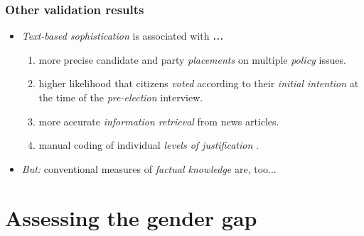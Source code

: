 \documentclass{beamer}
\begin{document}
\begin{frame} %
\frametitle{Other validation results}
\begin{itemize}
\item \emph{Text-based sophistication} is associated with \emph{\textbf{...}}
  \begin{enumerate}[\textbf{...}]
  \item<2-> more precise candidate and party \emph{placements} on multiple \emph{policy} issues.
  \item<3-> higher likelihood that citizens \emph{voted} according to their \emph{initial intention} at the time of the \emph{pre-election} interview.
  \item<4-> more accurate \emph{information retrieval} from news articles.
  \item<5-> manual coding of individual \emph{levels of justification} \citep{colombo2016justifications}.
  \end{enumerate}
  \item<6> \emph{But:} conventional measures of \emph{factual knowledge} are, too...
\end{itemize}
\end{frame}

\section{Assessing the gender gap}
\end{document}
